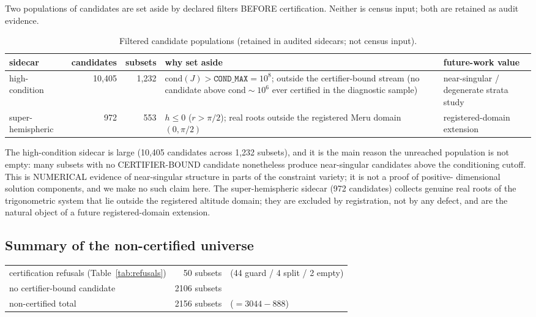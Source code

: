 \documentclass[pdflatex,sn-mathphys-num]{sn-jnl}
\begin{document}
Two populations of candidates are set aside by declared filters BEFORE certification. Neither is census input; both are retained as audit evidence.

\begin{table}[htbp]\centering
\caption{Filtered candidate populations (retained in audited sidecars; not census input).}
\label{tab:sidecars}
\small
\begin{tabular}{p{2.2cm}rr>{\raggedright\arraybackslash}p{3.7cm}>{\raggedright\arraybackslash}p{2.4cm}}\hline
sidecar & candidates & subsets & why set aside & future-work value \\\hline
high-condition & 10{,}405 & 1{,}232 & $\mathrm{cond}(J)>\texttt{COND\_MAX}=10^{8}$; outside the certifier-bound stream (no candidate above $\mathrm{cond}\sim10^{6}$ ever certified in the diagnostic sample) & near-singular / degenerate strata study \\
super-hemispheric & 972 & 553 & $h\le 0$ ($r>\pi/2$); real roots outside the registered Meru domain $(0,\pi/2)$ & registered-domain extension \\\hline
\end{tabular}
\end{table}

The high-condition sidecar is large (10,405 candidates across 1,232 subsets), and it is the main reason the unreached population is not empty: many subsets with no CERTIFIER-BOUND candidate nonetheless produce near-singular candidates above the conditioning cutoff. This is NUMERICAL evidence of near-singular structure in parts of the constraint variety; it is not a proof of positive-
dimensional solution components, and we make no such claim here. The super-hemispheric sidecar (972 candidates) collects genuine real roots of the trigonometric system that lie outside the registered altitude domain; they are excluded by registration, not by any defect, and are the natural object of a
future registered-domain extension.

\subsection{Summary of the non-certified universe}\label{sec:7.3}

\begin{center}
\begin{tabular}{lrl}\hline
certification refusals (Table~\ref{tab:refusals}) & 50 subsets & (44 guard / 4 split / 2 empty) \\
no certifier-bound candidate & 2106 subsets & \\\hline
non-certified total & 2156 subsets & ($=3044-888$) \\\hline
\end{tabular}
\end{center}
\end{document}
